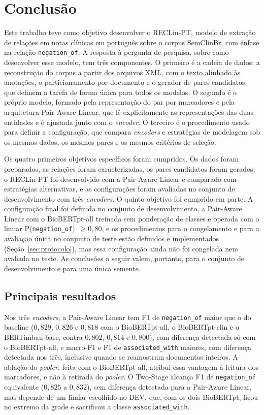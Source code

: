 \chapter[Conclusão]{Conclusão}
\label{cap:conclusao}

Este trabalho teve como objetivo desenvolver o RECLin-PT, modelo de extração de
relações em notas clínicas em português sobre o corpus SemClinBr, com ênfase na
relação \texttt{negation\_of}. A resposta à pergunta de pesquisa, sobre como
desenvolver esse modelo, tem três componentes. O primeiro é a cadeia de dados: a
reconstrução do corpus a partir dos arquivos XML, com o texto alinhado às anotações,
o particionamento por documento e o gerador de pares candidatos, que definem a
tarefa de forma única para todos os modelos. O segundo é o próprio modelo, formado
pela representação do par por marcadores e pela arquitetura Pair-Aware Linear, que
lê explicitamente as representações das duas entidades e é ajustada junto com o
\emph{encoder}. O terceiro é o procedimento usado para definir a configuração, que
compara \emph{encoders} e estratégias de modelagem sob os mesmos dados, os mesmos
pares e os mesmos critérios de seleção.

Os quatro primeiros objetivos específicos foram cumpridos. Os dados foram
preparados, as relações foram caracterizadas, os pares candidatos foram gerados, o
RECLin-PT foi desenvolvido com a Pair-Aware Linear e comparado com estratégias
alternativas, e as configurações foram avaliadas no conjunto de desenvolvimento com
três \emph{encoders}. O quinto objetivo foi cumprido em parte. A configuração final
foi definida no conjunto de desenvolvimento, a Pair-Aware Linear com o BioBERTpt-all
treinada sem ponderação de classes e operada com o limiar
P(\texttt{negation\_of})~$\geq 0{,}80$, e os procedimentos para o congelamento e
para a avaliação única no conjunto de teste estão definidos e implementados
(Seção~\ref{sec:protocolo}), mas essa configuração ainda não foi congelada nem
avaliada no teste. As conclusões a seguir valem, portanto, para o conjunto de
desenvolvimento e para uma única semente.

\section{Principais resultados}

Nos três \emph{encoders}, a Pair-Aware Linear tem F1 de \texttt{negation\_of} maior
que o do baseline ($0{,}829$, $0{,}826$ e $0{,}818$ com o BioBERTpt-all, o
BioBERTpt-clin e o BERTimbau-base, contra $0{,}802$, $0{,}814$ e $0{,}800$), com
diferença detectada só com o BioBERTpt-all, e macro-F1 e F1 de
\texttt{associated\_with} maiores, com diferença detectada nos três, inclusive
quando se reamostram documentos inteiros. A ablação do \emph{pooler}, feita com o
BioBERTpt-all, atribui essa vantagem à leitura dos marcadores, e não à retirada do
\emph{pooler}. O Two-Stage alcança F1 de
\texttt{negation\_of} equivalente ($0{,}825$ a $0{,}832$), sem diferença detectada
para a Pair-Aware Linear, mas depende de um limiar escolhido no DEV, que, com os
dois BioBERTpt, ficou no extremo da grade e sacrificou a classe
\texttt{associated\_with}.

